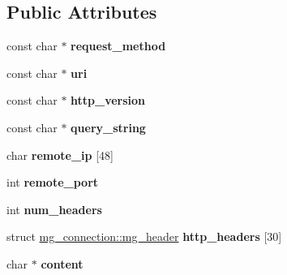 \subsection*{Public Attributes}
\begin{DoxyCompactItemize}
\item 
const char $\ast$ {\bfseries request\+\_\+method}\hypertarget{structmg__connection_a7a2b15778b91c5f4654271bc941e5e6f}{}\label{structmg__connection_a7a2b15778b91c5f4654271bc941e5e6f}

\item 
const char $\ast$ {\bfseries uri}\hypertarget{structmg__connection_a65b85efe4e7c90b57a9b7452c5bb7730}{}\label{structmg__connection_a65b85efe4e7c90b57a9b7452c5bb7730}

\item 
const char $\ast$ {\bfseries http\+\_\+version}\hypertarget{structmg__connection_aa2cad585b774df954a8da43b404db695}{}\label{structmg__connection_aa2cad585b774df954a8da43b404db695}

\item 
const char $\ast$ {\bfseries query\+\_\+string}\hypertarget{structmg__connection_a945360c8666acb1546867b9043fb6f61}{}\label{structmg__connection_a945360c8666acb1546867b9043fb6f61}

\item 
char {\bfseries remote\+\_\+ip} \mbox{[}48\mbox{]}\hypertarget{structmg__connection_aed0bf0830e52410e0ea6e404aaf19892}{}\label{structmg__connection_aed0bf0830e52410e0ea6e404aaf19892}

\item 
int {\bfseries remote\+\_\+port}\hypertarget{structmg__connection_a3a52f3da2e4d2dd772af27057276be6d}{}\label{structmg__connection_a3a52f3da2e4d2dd772af27057276be6d}

\item 
int {\bfseries num\+\_\+headers}\hypertarget{structmg__connection_a48af0c95935d50e2a33fc5dd2c275643}{}\label{structmg__connection_a48af0c95935d50e2a33fc5dd2c275643}

\item 
struct \hyperlink{structmg__connection_1_1mg__header}{mg\+\_\+connection\+::mg\+\_\+header} {\bfseries http\+\_\+headers} \mbox{[}30\mbox{]}\hypertarget{structmg__connection_a63386f3005373a7b41fe857a8535cf51}{}\label{structmg__connection_a63386f3005373a7b41fe857a8535cf51}

\item 
char $\ast$ {\bfseries content}\hypertarget{structmg__connection_a817740e63b59b7c45685f1cdb987f98c}{}\label{structmg__connection_a817740e63b59b7c45685f1cdb987f98c}


\end{DoxyCompactItemize}
